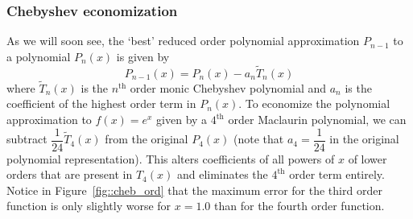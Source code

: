 \documentclass[11pt]{article}
\begin{document}
\subsubsection{Chebyshev economization}
As we will soon see, the `best' reduced order polynomial approximation \(P_{n-1}\) to a polynomial \(P_n(x)\) is given by \[P_{n-1}(x) = P_{n}(x) - a_n\tilde T_n(x)\] where \(\tilde T_n(x)\) is the \(n^\text{th}\) order monic Chebyshev polynomial and \(a_n\) is the coefficient of the highest order term in \(P_n(x)\). To economize the polynomial approximation to \(f(x) = e^x\) given by a \(4^\text{th}\) order Maclaurin polynomial, we can subtract \(\dfrac{1}{24}\tilde T_4(x)\) from the original \(P_4(x)\) (note that \(a_4=\dfrac{1}{24}\) in the original polynomial representation). This alters coefficients of all powers of \(x\) of lower orders that are present in \(T_4(x)\) and eliminates the \(4^\text{th}\) order term entirely. Notice in Figure~\ref{fig::cheb_ord} that the maximum error for the third order function is only slightly worse for \(x=1.0\) than for the fourth order function.
\end{document}
